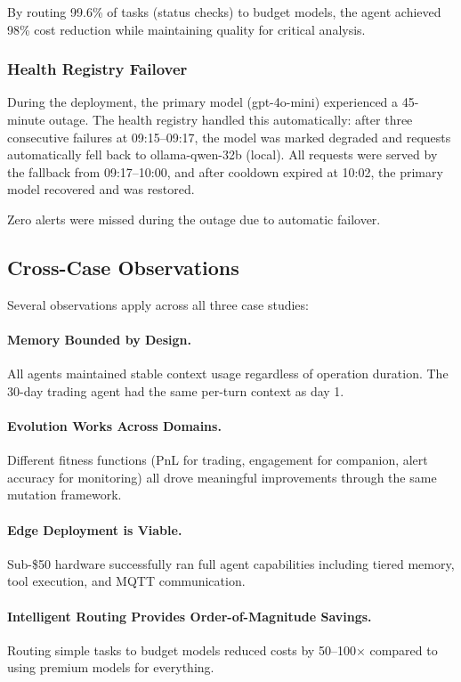\documentclass[conference]{IEEEtran}
\begin{document}
By routing 99.6\% of tasks (status checks) to budget models, the agent achieved 98\% cost reduction while maintaining quality for critical analysis.

\subsubsection{Health Registry Failover}

During the deployment, the primary model (gpt-4o-mini) experienced a 45-minute outage. The health registry handled this automatically: after three consecutive failures at 09:15--09:17, the model was marked degraded and requests automatically fell back to ollama-qwen-32b (local). All requests were served by the fallback from 09:17--10:00, and after cooldown expired at 10:02, the primary model recovered and was restored.

Zero alerts were missed during the outage due to automatic failover.

\subsection{Cross-Case Observations}

Several observations apply across all three case studies:

\paragraph{Memory Bounded by Design.} All agents maintained stable context usage regardless of operation duration. The 30-day trading agent had the same per-turn context as day 1.

\paragraph{Evolution Works Across Domains.} Different fitness functions (PnL for trading, engagement for companion, alert accuracy for monitoring) all drove meaningful improvements through the same mutation framework.

\paragraph{Edge Deployment is Viable.} Sub-\$50 hardware successfully ran full agent capabilities including tiered memory, tool execution, and MQTT communication.

\paragraph{Intelligent Routing Provides Order-of-Magnitude Savings.} Routing simple tasks to budget models reduced costs by 50--100$\times$ compared to using premium models for everything.
\end{document}
